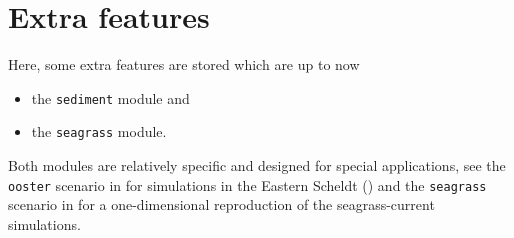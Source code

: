 %
%

\section{Extra features \label{sec:extra}}

Here, some extra features are stored which are up to now

\begin{itemize}
\item the {\tt sediment} module and
\item the {\tt seagrass} module.
\end{itemize}

Both modules are relatively specific and designed for special
applications, see the {\tt ooster} scenario in  for
simulations in the Eastern Scheldt (\cite{Burchardetal2000}) and the
{\tt seagrass} scenario in  for a one-dimensional
reproduction of the \cite{VerduinBackhaus2000} seagrass-current
simulations.
